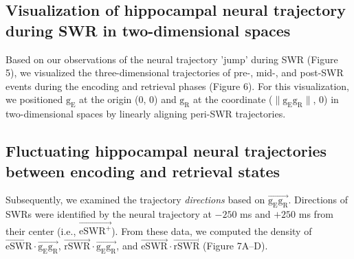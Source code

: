 \subsection{Visualization of hippocampal neural trajectory during SWR in two-dimensional spaces}
Based on our observations of the neural trajectory 'jump' during SWR (Figure 5), we visualized the three-dimensional trajectories of pre-, mid-, and post-SWR events during the encoding and retrieval phases (Figure 6). For this visualization, we positioned $\mathrm{g_{E}}$ at the origin (0, 0) and $\mathrm{g_{R}}$ at the coordinate ($\mathrm{\lVert g_{E}g_{R} \rVert}$, 0) in two-dimensional spaces by linearly aligning peri-SWR trajectories. 

\subsection{Fluctuating hippocampal neural trajectories between encoding and retrieval states}
Subsequently, we examined the trajectory \textit{directions} based on $\overrightarrow{\mathrm{g_{E}g_{R}}}$. Directions of SWRs were identified by the neural trajectory at $-250$ ms and $+250$ ms from their center (i.e., $\overrightarrow{\mathrm{eSWR^+}}$). From these data, we computed the density of $\overrightarrow{\mathrm{eSWR}} \cdot \overrightarrow{\mathrm{g_{E}g_{R}}}$, $\overrightarrow{\mathrm{rSWR}} \cdot \overrightarrow{\mathrm{g_{E}g_{R}}}$, and $\overrightarrow{\mathrm{eSWR}} \cdot \overrightarrow{\mathrm{rSWR}}$ (Figure 7A--D).